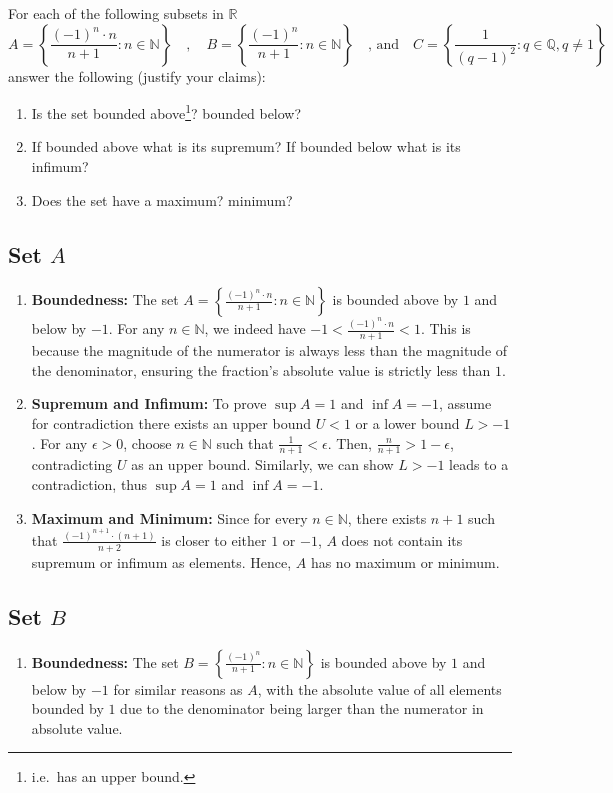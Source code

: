 \documentclass[10pt]{article}
\newcommand{\N}{\mathbb{N}}
\newcommand{\R}{\mathbb{R}}
\newcommand{\Q}{\mathbb{Q}}
\newenvironment{problem}[2][Problem]{\begin{trivlist}
\item[\hskip \labelsep {\bfseries #1}\hskip \labelsep {\bfseries #2.}]}{\end{trivlist}}
\begin{document}
\begin{problem}{4}
	For each of the following subsets in $ \R $
	\[ A=\left\{ \frac{(-1)^n \cdot n}{n+1} : n \in \N \right\} \quad,\quad B=\left\{ \frac{(-1)^n}{n+1} : n \in \N \right\} \quad \text{, and}\quad C=\left\{ \frac{1}{(q-1)^2} : q \in \Q, q \neq 1 \right\}  \]
	answer the following (justify your claims):
	\begin{enumerate}
		\item Is the set bounded above\footnote{i.e.~has an upper bound.}? bounded below?
		\item If bounded above what is its supremum? If bounded below what is its infimum?
		\item Does the set have a maximum? minimum?
	\end{enumerate}

    \subsection*{Set $A$}
\begin{enumerate}
    \item \textbf{Boundedness:} The set $A = \left\{\frac{(-1)^n \cdot n}{n+1} : n \in \mathbb{N}\right\}$ is bounded above by $1$ and below by $-1$. For any $n \in \mathbb{N}$, we indeed have $-1 < \frac{(-1)^n \cdot n}{n+1} < 1$. This is because the magnitude of the numerator is always less than the magnitude of the denominator, ensuring the fraction's absolute value is strictly less than $1$.
    
    \item \textbf{Supremum and Infimum:} To prove $\sup A = 1$ and $\inf A = -1$, assume for contradiction there exists an upper bound $U < 1$ or a lower bound $L > -1$. For any $\epsilon > 0$, choose $n \in \mathbb{N}$ such that $\frac{1}{n+1} < \epsilon$. Then, $\frac{n}{n+1} > 1 - \epsilon$, contradicting $U$ as an upper bound. Similarly, we can show $L > -1$ leads to a contradiction, thus $\sup A = 1$ and $\inf A = -1$.
    
    \item \textbf{Maximum and Minimum:} Since for every $n \in \mathbb{N}$, there exists $n+1$ such that $\frac{(-1)^{n+1} \cdot (n+1)}{n+2}$ is closer to either $1$ or $-1$, $A$ does not contain its supremum or infimum as elements. Hence, $A$ has no maximum or minimum.
\end{enumerate}

\subsection*{Set $B$}
\begin{enumerate}
    \item \textbf{Boundedness:} The set $B = \left\{\frac{(-1)^n}{n+1} : n \in \mathbb{N}\right\}$ is bounded above by $1$ and below by $-1$ for similar reasons as $A$, with the absolute value of all elements bounded by $1$ due to the denominator being larger than the numerator in absolute value.
    

\end{enumerate}
\end{problem}
\end{document}
